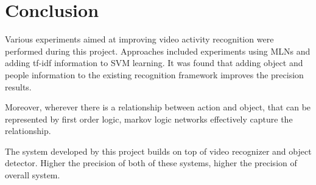 \chapter{Conclusion}

\label{ch6_CONCLUSION}

Various experiments aimed at improving video activity recognition were performed during this project.
Approaches included experiments using MLNs and adding tf-idf information to SVM learning.
It was found that adding object and people information to the existing recognition framework
improves the precision results.

Moreover, wherever there is a relationship between action and object, that can be represented by first order logic,
markov logic networks effectively capture the relationship.

The system developed by this project builds on top of video recognizer and object detector.
Higher the precision of both of these systems, higher the precision of overall system.
